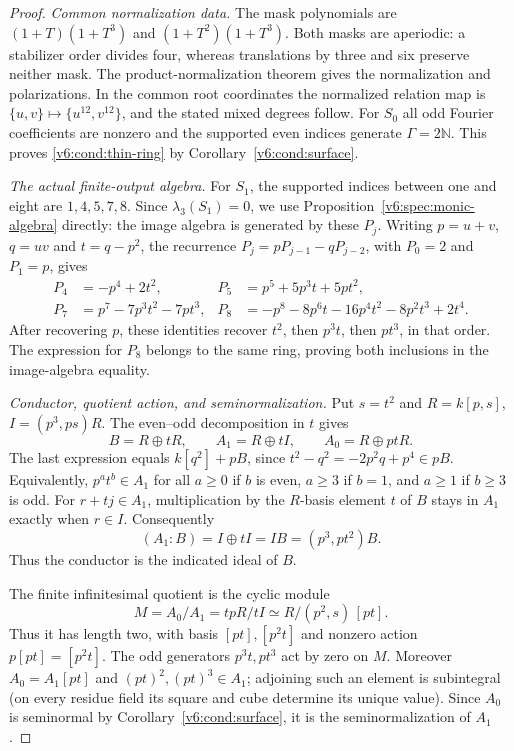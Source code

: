 \documentclass[10pt,fleqn]{article}
\numberwithin{equation}{section}
\begin{document}
\begin{proof}
\emph{Common normalization data.}
The mask polynomials are $(1+T)(1+T^3)$ and $(1+T^2)(1+T^3)$.
Both masks are aperiodic: a stabilizer order divides four, whereas
translations by three and six preserve neither mask.
The product-normalization theorem \cite[Theorem~5.4]{LiProfileGeometry} gives the normalization and polarizations.
In the common root coordinates the normalized relation map is
$\{u,v\}\mapsto\{u^{12},v^{12}\}$, and the stated mixed degrees follow.
For $S_0$ all odd Fourier coefficients are nonzero and the supported
even indices generate $\Gamma=2\mathbb N$.  This proves
\eqref{v6:cond:thin-ring} by Corollary~\ref{v6:cond:surface}.

\emph{The actual finite-output algebra.}
For $S_1$, the supported indices between one and eight are
$1,4,5,7,8$.  Since $\lambda_3(S_1)=0$, we use
Proposition~\ref{v6:spec:monic-algebra} directly: the image algebra is
generated by these $P_j$.
Writing $p=u+v$, $q=uv$ and $t=q-p^2$, the recurrence
$P_j=pP_{j-1}-qP_{j-2}$, with $P_0=2$ and $P_1=p$, gives
\begin{align*}
 P_4&=-p^4+2t^2,&
 P_5&=p^5+5p^3t+5pt^2,\\
 P_7&=p^7-7p^3t^2-7pt^3,&
 P_8&=-p^8-8p^6t-16p^4t^2-8p^2t^3+2t^4.
\end{align*}
After recovering $p$, these identities recover $t^2$, then $p^3t$,
then $pt^3$, in that order.  The expression for $P_8$ belongs to the
same ring, proving both inclusions in the image-algebra equality.

\emph{Conductor, quotient action, and seminormalization.}
Put $s=t^2$ and
$R=k[p,s]$, $I=(p^3,ps)R$.  The even--odd decomposition in $t$ gives
\[
 B=R\oplus tR,\qquad A_1=R\oplus tI,\qquad
 A_0=R\oplus ptR.
\]
The last expression equals $k[q^2]+pB$, since
$t^2-q^2=-2p^2q+p^4\in pB$.  Equivalently, $p^at^b\in A_1$ for all
$a\ge0$ if $b$ is even, $a\ge3$ if $b=1$, and $a\ge1$ if $b\ge3$ is odd.
For $r+tj\in A_1$, multiplication by the $R$-basis element $t$ of
$B$ stays in $A_1$ exactly when $r\in I$.  Consequently
\[
 (A_1:B)=I\oplus tI=IB=(p^3,pt^2)B.
\]
Thus the conductor is the indicated ideal of $B$.

The finite infinitesimal quotient is the cyclic module
\[
 M=A_0/A_1=tpR/tI\simeq R/(p^2,s)\,[pt].
\]
Thus it has length two, with basis $[pt],[p^2t]$ and nonzero action
$p[pt]=[p^2t]$.  The odd generators $p^3t,pt^3$ act by zero on $M$.
Moreover $A_0=A_1[pt]$ and $(pt)^2,(pt)^3\in A_1$; adjoining such an
element is subintegral (on every residue field its square and cube determine
its unique value).  Since $A_0$ is seminormal by
Corollary~\ref{v6:cond:surface}, it is the seminormalization of $A_1$.


\end{proof}
\end{document}
